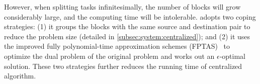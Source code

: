 However, when splitting tasks infinitesimally, the number of blocks
will grow considerably large, and the computing time will be
intolerable. \name adopts two coping strategies: (1) it groups the
blocks with the same source and destination pair to reduce the
problem size (detailed in \Section\ref{subsec:system:centralized});
and (2) it uses the improved fully polynomial-time approximation
schemes (FPTAS)~\cite{fleischer2000approximating} to optimize the
dual problem of the original problem and works out an
$\epsilon$-optimal solution. These two strategies further reduces the
running time of centralized algorithm.





